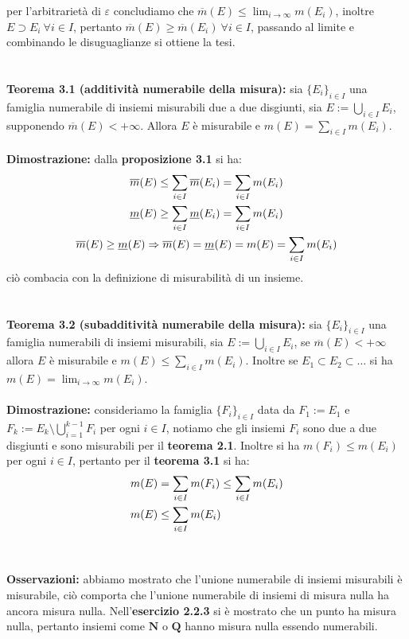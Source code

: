 \documentclass{article}
\begin{document}
per l'arbitrarietà di $\varepsilon$ concludiamo che $\overline{m}(E) \leq \lim_{i \rightarrow \infty} m(E_i)$, inoltre $E \supset E_i \ \forall i \in I$, pertanto $\overline{m}(E) \geq \overline{m}(E_i) \ \forall i \in I$, passando al limite e combinando le disuguaglianze si ottiene la tesi. \\ \\ \\
\textbf{Teorema 3.1 (additività numerabile della misura):} sia $\{ E_i \}_{i \in I}$ una famiglia numerabile di insiemi misurabili due a due disgiunti, sia $E := \bigcup_{i \in I} E_i$, supponendo $\overline{m}(E) < + \infty$. Allora $E$ è misurabile e $m(E) = \sum_{i \in I} m(E_i)$. \\ \\
\textbf{Dimostrazione:} dalla \textbf{proposizione 3.1} si ha:
\begin{gather}
    \overline{m}(E) \leq \sum_{i \in I} \overline{m}(E_i) = \sum_{i \in I} m(E_i) \notag \\
    \underline{m}(E) \geq \sum_{i \in I} \underline{m}(E_i) = \sum_{i \in I} m(E_i) \notag \\
    \overline{m}(E) \geq \underline{m}(E) \Rightarrow \overline{m}(E) = \underline{m}(E) = m(E) = \sum_{i \in I} m(E_i) \notag
\end{gather}
ciò combacia con la definizione di misurabilità di un insieme. \\ \\ \\
\textbf{Teorema 3.2 (subadditività numerabile della misura):} sia $\{ E_i \}_{i \in I}$ una famiglia numerabili di insiemi misurabili, sia $E := \bigcup_{i \in I} E_i$, se $\overline{m}(E) < + \infty$ allora $E$ è misurabile e $m(E) \leq \sum_{i \in I} m(E_i)$. Inoltre se $E_1 \subset E_2 \subset \dots$ si ha $m(E) = \lim_{i \rightarrow \infty} m(E_i)$. \\ \\
\textbf{Dimostrazione:} consideriamo la famiglia $\{ F_i \}_{i \in I}$ data da $F_1 := E_1$ e $F_k := E_k \setminus \bigcup_{i = 1}^{k - 1} F_i$ per ogni $i \in I$, notiamo che gli insiemi $F_i$ sono due a due disgiunti e sono misurabili per il \textbf{teorema 2.1}. Inoltre si ha $m(F_i) \leq m(E_i)$ per ogni $i \in I$, pertanto per il \textbf{teorema 3.1} si ha:
\begin{align}
    m(E) &= \sum_{i \in I} m(F_i) \leq \sum_{i \in I} m(E_i) \notag \\
    m(E) &\leq \sum_{i \in I} m(E_i) \notag
\end{align}
\\ \\
\textbf{Osservazioni:} abbiamo mostrato che l'unione numerabile di insiemi misurabili è misurabile, ciò comporta che l'unione numerabile di insiemi di misura nulla ha ancora misura nulla. Nell'\textbf{esercizio 2.2.3} si è mostrato che un punto ha misura nulla, pertanto insiemi come $\mathbf{N}$ o $\mathbf{Q}$ hanno misura nulla essendo numerabili.
\end{document}

